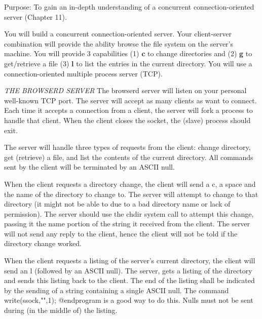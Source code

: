 

\parindent 0pt

Purpose: To gain an in-depth understanding of
a concurrent connection-oriented server (Chapter 11).

You will build a concurrent connection-oriented server.
Your client-server combination will provide the ability browse
the file system on the server's machine.
You will provide 3 capabilities 
(1) {\bf c} to change directories and
(2) {\bf g} to get/retrieve a file
(3) {\bf l} to list the entries in the current directory.
You will use a connection-oriented multiple process server (TCP).

{\it THE BROWSERD SERVER}
\hfill\break
The {\ltt{}browserd} server will listen on your personal well-known TCP port.
The server will accept as many clients as want to connect.
Each time it accepts a connection from a client,
the server will fork a process to handle that client. 
When the client closes the socket, the (slave) process should exit.

The server will handle three types of requests from the client:
change directory,
get (retrieve) a file,
and list the contents of the current directory.
All commands sent by the client will be terminated by an ASCII null.

When the client requests a directory change,
the client will send a c, a space and the name of the directory
to change to.
The server will attempt to change to that directory (it might not be able
to due to a bad directory name or lack of permission).
The server should use the {\ltt{}chdir} system call to attempt this change,
passing it the name portion of the string it received from the client.
The server will not send any reply to the client,
hence the client will not be told if the directory change worked.

When the client requests a listing of the server's current directory,
the client will send an l (followed by an ASCII null).
The server, gets a listing of the directory and sends this listing
back to the client.
The end of the listing shall be indicated by the sending of a string
containing a single ASCII null.
The command
{\cprogram
write(ssock,"\0",1);
@endprogram} 
is a good way to do this.
Nulls must not be sent during (in the middle of) the listing. 

